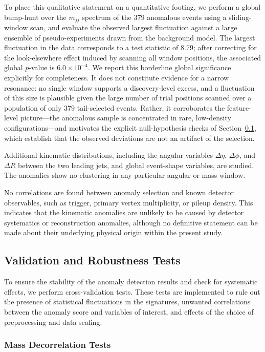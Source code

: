 \documentclass[11pt,a4paper,twocolumn]{article}
\begin{document}
To place this qualitative statement on a quantitative footing, we perform a global bump-hunt over the $m_{jj}$ spectrum of the $379$ anomalous events using a sliding-window scan, and evaluate the observed largest fluctuation against a large ensemble of pseudo-experiments drawn from the background model. The largest fluctuation in the data corresponds to a test statistic of $8.79$; after correcting for the look-elsewhere effect induced by scanning all window positions, the associated global $p$-value is $6.0\times10^{-4}$. We report this borderline global significance explicitly for completeness. It does not constitute evidence for a narrow resonance: no single window supports a discovery-level excess, and a fluctuation of this size is plausible given the large number of trial positions scanned over a population of only $379$ tail-selected events. Rather, it corroborates the feature-level picture---the anomalous sample is concentrated in rare, low-density configurations---and motivates the explicit null-hypothesis checks of Section~\ref{subsec:validation}, which establish that the observed deviations are not an artifact of the selection.

Additional kinematic distributions, including the angular variables $\Delta\eta$, $\Delta\phi$, and $\Delta R$ between the two leading jets, and global event-shape variables, are studied. The anomalies show no clustering in any particular angular or mass window.

No correlations are found between anomaly selection and known detector observables, such as trigger, primary vertex multiplicity, or pileup density. This indicates that the kinematic anomalies are unlikely to be caused by detector systematics or reconstruction anomalies, although no definitive statement can be made about their underlying physical origin within the present study.

\subsection{Validation and Robustness Tests}
\label{subsec:validation}

To ensure the stability of the anomaly detection results and check for systematic effects, we perform cross-validation tests. These tests are implemented to rule out the presence of statistical fluctuations in the signatures, unwanted correlations between the anomaly score and variables of interest, and effects of the choice of preprocessing and data scaling.

\subsubsection{Mass Decorrelation Tests}
\end{document}
